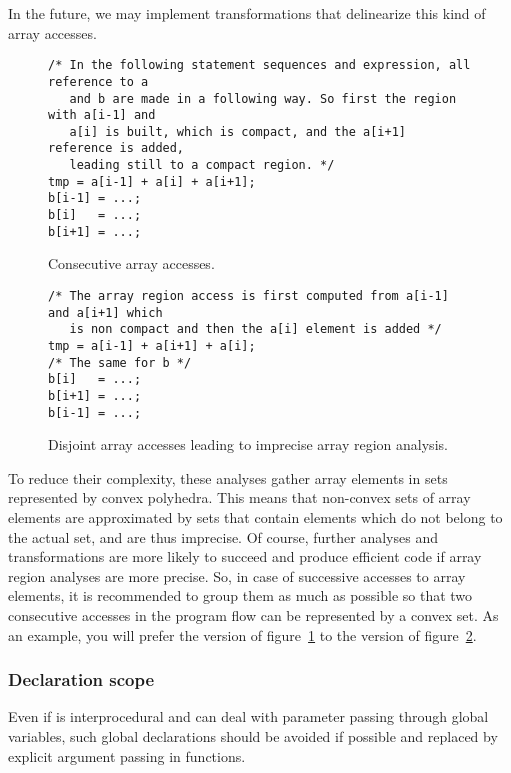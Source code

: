 \documentclass[a4paper]{article}
\begin{document}
In the future, we may implement transformations that delinearize this kind
of array accesses.

\begin{figure}
  \centering
  \begin{lstlisting}
/* In the following statement sequences and expression, all reference to a
   and b are made in a following way. So first the region with a[i-1] and
   a[i] is built, which is compact, and the a[i+1] reference is added,
   leading still to a compact region. */
tmp = a[i-1] + a[i] + a[i+1];
b[i-1] = ...;
b[i]   = ...;
b[i+1] = ...;
  \end{lstlisting}
  \caption{Consecutive array accesses.}
  \label{fig:consecutive_array_accesses}
\end{figure}

\begin{figure}
  \centering
  \begin{lstlisting}
/* The array region access is first computed from a[i-1] and a[i+1] which
   is non compact and then the a[i] element is added */
tmp = a[i-1] + a[i+1] + a[i];
/* The same for b */
b[i]   = ...;
b[i+1] = ...;
b[i-1] = ...;
  \end{lstlisting}
  \caption{Disjoint array accesses leading to imprecise array region
    analysis.}
  \label{fig:disjoint_array_accesses}
\end{figure}

To reduce their complexity, these analyses gather array elements in
sets represented by convex polyhedra. This means that non-convex sets
of array elements are approximated by sets that contain elements which
do not belong to the actual set, and are thus imprecise. Of course,
further analyses and transformations are more likely to succeed and
produce efficient code if array region analyses are more precise. So,
in case of successive accesses to array elements, it is recommended to
group them as much as possible so that two consecutive accesses in the
program flow can be represented by a convex set. As an example, you
will prefer the version of figure~\ref{fig:consecutive_array_accesses}
to the version of figure~\ref{fig:disjoint_array_accesses}.


\subsubsection{Declaration scope}
\label{sec:declaration-scope}

Even if \Apips is interprocedural and can deal with parameter passing
through global variables, such global declarations should be avoided if
possible and replaced by explicit argument passing in functions.
\end{document}
